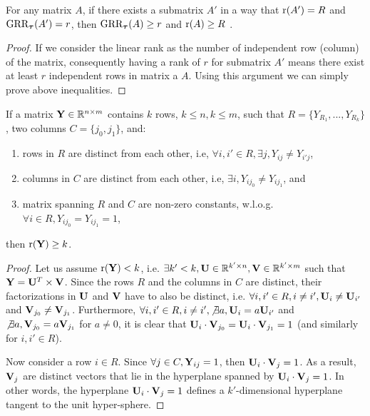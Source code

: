 \documentclass{article}
\newcommand{\pouya}[1]{\todo[color=green!20]{\textbf{p:} #1}{}}
\newcommand{\R}{\ensuremath{\Real}}
\begin{document}
\setcounter{section}{3}
\begin{thm:lemma}
For any matrix $A$, if there exists a submatrix $A'$ in a way that $\mathrm{r}(A')=R$ and $\text{GRR}_{{\boldsymbol{\tau}}}(A')=r$, then $\text{GRR}_{{\boldsymbol{\tau}}}(A)\geq  r$ and $\mathrm{r}(A)\geq R$
. \begin{proof}
If we consider the linear rank as the number of independent row (column) of the matrix, consequently having a rank of $r$ for submatrix $A'$ means there exist at least $r$ independent rows in matrix a $A$. Using this argument we can simply prove above inequalities.
\end{proof}
\end{thm:lemma}

\begin{thm:thm}
		If a matrix $\Y\in\R^{n\times m}$ contains $k$ rows, $k\leq n,k\leq m$, such that $R=\{Y_{R_1},...,Y_{R_k}\}$, two columns $C=\{j_0,j_1\}$, and:
	\begin{enumerate}
	\item rows in $R$ are distinct from each other, i.e, $\forall i,i'\in R, \exists j,Y_{ij}\neq Y_{i'j}$,
	\item columns in $C$ are distinct from each other, i.e, $\exists i,Y_{ij_0}\neq Y_{ij_1}$, and
	\item matrix spanning $R$ and $C$ are non-zero constants, w.l.o.g. $\forall i\in R,Y_{ij_0}=Y_{ij_1}=1$,
	\end{enumerate}
	then $\mathrm{r}(\mathbf{Y})\geq k$.
	\begin{proof}
	
				Let us assume $\mathrm{r}(\mathbf{Y})<k$, i.e. $\exists k'<k, \U\in\R^{k'\times n}, \V\in\R^{k'\times m}$ such that $\mathbf{Y}=\mathbf{U}^T\times\mathbf{V}$.
		Since the rows $R$ and the columns in $C$ are distinct, their factorizations in $\mathbf{U}$ and $\mathbf{V}$ have to also be distinct, i.e. $\forall i,i'\in R, i\neq i', \mathbf{U}_{i}\neq\mathbf{U}_{i'}$ and $\mathbf{V}_{j_0}\neq\mathbf{V}_{j_1}$.
		Furthermore, $\forall i,i'\in R, i\neq i', \not\exists a,\mathbf{U}_{i}=a\mathbf{U}_{i'}$ and $\not\exists a,\mathbf{V}_{j_0}=a\mathbf{V}_{j_1}$ for $a\neq0$, it is clear that $\mathbf{U}_i\cdot\mathbf{V}_{j_0}=\mathbf{U}_i\cdot\mathbf{V}_{j_1}=1$ (and similarly for $i,i'\in R$).

		Now consider a row $i\in R$. Since $\forall j\in C, \mathbf{Y}_{ij}=1$, then $\mathbf{U}_i\cdot\mathbf{V}_{j}=1$.
		As a result, $\mathbf{V}_j$ are distinct vectors that lie in the hyperplane spanned by $\mathbf{U}_i\cdot\mathbf{V}_j=1$.
		In other words, the hyperplane $\mathbf{U}_i\cdot\mathbf{V}_j=1$ defines a $k'$-dimensional hyperplane tangent to the unit hyper-sphere.


\end{proof}
\end{thm:thm}
\end{document}
